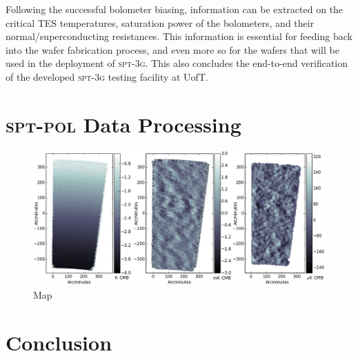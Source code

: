 \documentclass[iop]{emulateapj}
\begin{document}
Following the successful bolometer biasing, information can be extracted on the critical TES temperatures, saturation power of the bolometers, and their normal/superconducting resistances.  This information is essential for feeding back into the wafer fabrication process, and even more so for the wafers that will be used in the deployment of \textsc{spt-3g}.  This also concludes the end-to-end verification of the developed \textsc{spt-3g} testing facility at UofT.

\section{\textsc{spt-pol} Data Processing}
\label{data_section}

\begin{figure}
	\includegraphics[width=\linewidth]{paper_map}
	\centering
	\caption{Map}
	\label{map}
\end{figure}


\section{Conclusion}
\end{document}
